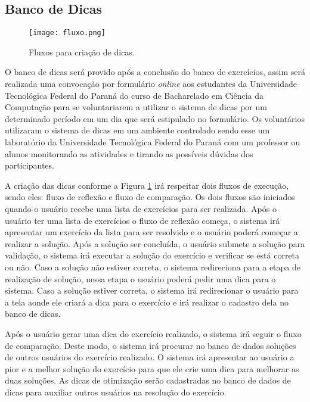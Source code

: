 \subsection{Banco de Dicas}

\begin{figure}[ht]
	\captionsetup{justification=centering}
	\texttt{[image: fluxo.png]}
	\caption{Fluxos para criação de dicas.}
	\label{figura:dicafluxo}
\end{figure}


O banco de dicas será provido após a conclusão do banco de exercícios, assim será realizada uma convocação por formulário \textit{online} aos estudantes da Universidade Tecnológica Federal do Paraná do curso de Bacharelado em Ciência da Computação para se voluntariarem a utilizar o sistema de dicas por um determinado período em um dia que será estipulado no formulário. Os voluntários utilizaram o sistema de dicas em um ambiente controlado sendo esse um laboratório da Universidade Tecnológica Federal do Paraná com um professor ou alunos monitorando as atividades e tirando as possíveis dúvidas dos participantes. 

A criação das dicas conforme a Figura \ref{figura:dicafluxo} irá respeitar dois fluxos de execução, sendo eles: fluxo de reflexão e fluxo de comparação. Os dois fluxos são iniciados quando o usuário recebe uma lista de exercícios para ser realizada. Após o usuário ter uma lista de exercícios o fluxo de reflexão começa, o sistema irá apresentar um exercício da lista para ser resolvido e o usuário poderá começar a realizar a solução. Após a solução ser concluída, o usuário submete a solução para validação, o sistema irá executar a solução do exercício e verificar se está correta ou não. Caso a solução não estiver correta, o sistema redireciona para a etapa de realização de solução, nessa etapa o usuário poderá pedir uma dica para o sistema. Caso a solução estiver correta, o sistema irá redirecionar o usuário para a tela aonde ele criará a dica para o exercício e irá realizar o cadastro dela no banco de dicas.

Após o usuário gerar uma dica do exercício realizado, o sistema irá seguir o fluxo de comparação. Deste modo, o sistema irá procurar no banco de dados soluções de outros usuários do exercício realizado. O sistema irá apresentar ao usuário a pior e a melhor solução do exercício para que ele crie uma dica para melhorar as duas soluções. As dicas de otimização serão cadastradas no banco de dados de dicas para auxiliar outros usuários na resolução do exercício.

